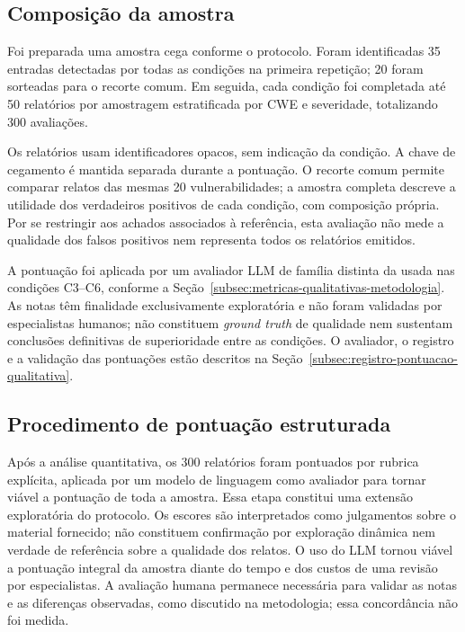\subsection{Composição da amostra}\label{subsec:resultados-rubrica}

Foi preparada uma amostra cega conforme o protocolo. Foram
identificadas 35 entradas detectadas por todas as condições na primeira repetição;
20 foram sorteadas para o recorte comum. Em seguida, cada condição foi completada
até 50 relatórios por amostragem estratificada por CWE e severidade, totalizando
300 avaliações.

Os relatórios usam identificadores opacos, sem indicação da condição. A chave
de cegamento é mantida separada durante a pontuação. O recorte comum permite
comparar relatos das mesmas 20 vulnerabilidades; a amostra completa descreve
a utilidade dos verdadeiros positivos de cada condição, com composição própria.
Por se restringir aos achados associados à referência, esta avaliação não mede
a qualidade dos falsos positivos nem representa todos os relatórios emitidos.

A pontuação foi aplicada por um avaliador LLM de família distinta da usada nas
condições C3--C6, conforme a Seção~\ref{subsec:metricas-qualitativas-metodologia}.
As notas têm finalidade exclusivamente exploratória e não foram validadas por
especialistas humanos; não constituem \textit{ground truth} de qualidade nem
sustentam conclusões definitivas de superioridade entre as condições.
O avaliador, o registro e a validação das pontuações estão descritos na
Seção~\ref{subsec:registro-pontuacao-qualitativa}.

\subsection{Procedimento de pontuação estruturada}\label{subsec:procedimento-pontuacao-qualitativa}

Após a análise quantitativa, os 300 relatórios foram pontuados por rubrica
explícita, aplicada por um modelo de linguagem como avaliador para tornar viável
a pontuação de toda a amostra. Essa etapa constitui uma extensão exploratória do
protocolo. Os escores são interpretados como julgamentos sobre o material
fornecido; não constituem confirmação por exploração dinâmica nem verdade de
referência sobre a qualidade dos relatos. O uso do LLM tornou viável a pontuação
integral da amostra diante do tempo e dos custos de uma revisão por especialistas.
A avaliação humana permanece necessária para validar as notas e as diferenças
observadas, como discutido na metodologia; essa concordância não foi medida.

